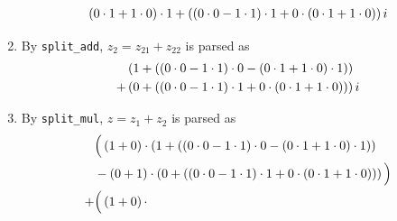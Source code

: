 \begin{boxexample}
\begin{enumerate}[noitemsep]
\begin{align*}
{                    \left( 0 \cdot 1 + 1 \cdot 0 \right)
                        \cdot
                    1
                  } + \left( 
                    \left( 0 \cdot 0 - 1 \cdot 1 \right)
                        \cdot
                    1
                    +
                    0
                        \cdot
                    \left( 0 \cdot 1 + 1 \cdot 0 \right)
                   \right)i
              \end{align*}
        \item By \lstinline|split_add|, $z_2 = z_{21} + z_{22}$ is parsed as
              \begin{align*}
                  &\left( 1 + \left( 
                    \left( 0 \cdot 0 - 1 \cdot 1 \right)
                        \cdot
                    0
                    -
                    \left( 0 \cdot 1 + 1 \cdot 0 \right)
                        \cdot
                    1
                   \right) \right) \\
                  + &\left( 0 + \left( 
                    \left( 0 \cdot 0 - 1 \cdot 1 \right)
                        \cdot
                    1
                    +
                    0
                        \cdot
                    \left( 0 \cdot 1 + 1 \cdot 0 \right)
                   \right) \right)i
              \end{align*}
        \item By \lstinline|split_mul|, $z = z_1 + z_2$ is parsed as
              \hspace{-2em}
              \begin{align*}
                  &\Big(
                    \parenth{1 + 0}
                        \cdot
                    \parenth{1 + \parenth{
                        \parenth{0 \cdot 0 - 1 \cdot 1}
                            \cdot
                        0
                        -
                        \parenth{0 \cdot 1 + 1 \cdot 0}
                            \cdot
                        1
                    }} \\
                    & -
                    \parenth{0 + 1}
                        \cdot
                    \parenth{0 + \parenth{
                        \parenth{0 \cdot 0 - 1 \cdot 1}
                            \cdot
                        1
                        +
                        0
                            \cdot
                        \parenth{0 \cdot 1 + 1 \cdot 0}
                    }}
                  \Big) \\
                  + &\Big(
                    \parenth{1 + 0}
                        \cdot

\end{align*}
\end{enumerate}
\end{boxexample}
